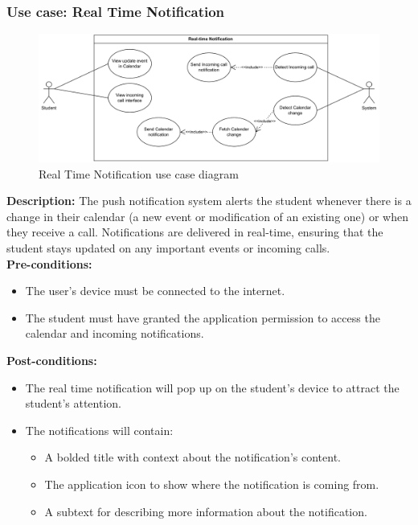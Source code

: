 \documentclass[12pt]{article}
\begin{document}
\subsubsection{Use case: Real Time Notification}
    \begin{figure}[H]
        \centering
        \includegraphics[width=1\textwidth]{image/Real-timeNotificationUseCase.pdf} 
        \caption{Real Time Notification use case diagram}
        \label{fig:notification_usecase}
    \end{figure}
    \textbf{Description:} The push notification system alerts the student whenever there is a change in their calendar (a new event or modification of an existing one) or when they receive a call. Notifications are delivered in real-time, ensuring that the student stays updated on any important events or incoming calls. \\
    
    \noindent \textbf{Pre-conditions:} 
        \begin{itemize}
            \item The user’s device must be connected to the internet.
            \item The student must have granted the application permission to access the calendar and incoming notifications.
        \end{itemize}
    \noindent \textbf{Post-conditions:}
    \begin{itemize}
        \item The real time notification will pop up on the student's device to attract the student's attention.
        \item The notifications will contain:
        \begin{itemize}
            \item A bolded title with context about the notification’s content.
            \item The application icon to show where the notification is coming from.
            \item A subtext for describing more information about the notification.
        \end{itemize}
    \end{itemize}
\end{document}
